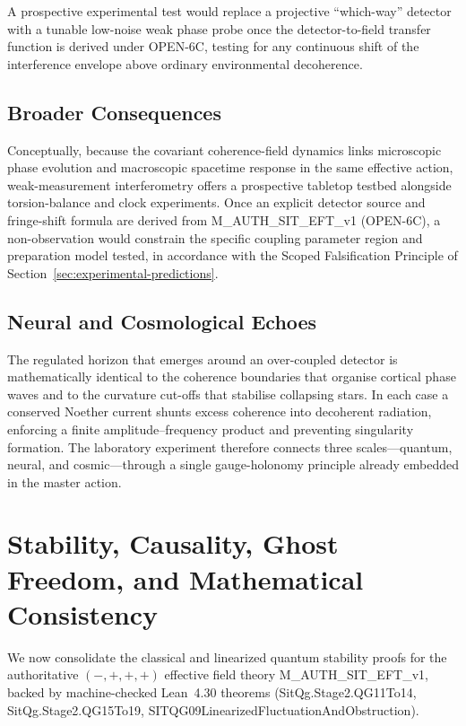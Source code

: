 \documentclass[american,11pt,letterpaper]{article}
\def\texttt#1{#1}%
\begin{document}
A prospective experimental test would replace a projective
``which-way'' detector with a tunable low-noise weak phase probe once
the detector-to-field transfer function is derived under
\texttt{OPEN-6C}, testing for any continuous shift of the interference
envelope above ordinary environmental decoherence.

\subsection{Broader Consequences}

Conceptually, because the covariant coherence-field dynamics links
microscopic phase evolution and macroscopic spacetime response in the
same effective action, weak-measurement interferometry offers a
prospective tabletop testbed alongside torsion-balance and clock
experiments. Once an explicit detector source and fringe-shift formula
are derived from \texttt{M\_AUTH\_SIT\_EFT\_v1} (\texttt{OPEN-6C}),
a non-observation would constrain the specific coupling parameter
region and preparation model tested, in accordance with the Scoped
Falsification Principle of Section~\ref{sec:experimental-predictions}.

\subsection{Neural and Cosmological Echoes}

The regulated horizon that emerges around an over-coupled detector
is mathematically identical to the coherence boundaries that
organise cortical phase waves and to the curvature cut-offs that
stabilise collapsing stars.  In each case a conserved Noether
current shunts excess coherence into decoherent radiation,
enforcing a finite amplitude--frequency product and preventing
singularity formation.  The laboratory experiment therefore
connects three scales---quantum, neural, and cosmic---through a single
gauge-holonomy principle already embedded in the master action.



\section{Stability, Causality, Ghost Freedom, and Mathematical Consistency}
\label{sec:stability-causality}

We now consolidate the classical and linearized quantum stability proofs for the authoritative $(-,+,+,+)$ effective field theory \texttt{M\_AUTH\_SIT\_EFT\_v1}, backed by machine-checked Lean~4.30 theorems (\texttt{SitQg.Stage2.QG11To14}, \texttt{SitQg.Stage2.QG15To19}, \texttt{SITQG09\allowbreak{}Linearized\allowbreak{}Fluctuation\allowbreak{}And\allowbreak{}Obstruction}).
\end{document}
